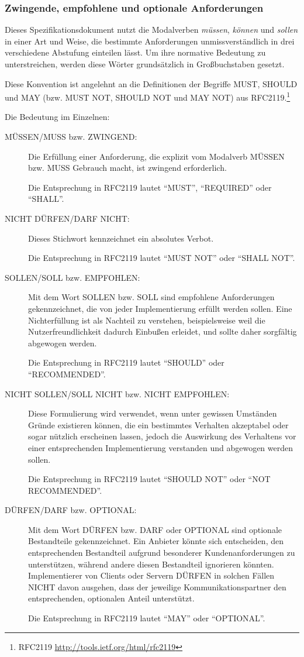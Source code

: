 \documentclass[,a4paper]{article}
\begin{document}
\subsubsection{Zwingende, empfohlene und optionale
Anforderungen}\label{mussux5fsollux5fdarf}

Dieses Spezifikationsdokument nutzt die Modalverben \emph{müssen},
\emph{können} und \emph{sollen} in einer Art und Weise, die bestimmte
Anforderungen unmissverständlich in drei verschiedene Abstufung
einteilen lässt. Um ihre normative Bedeutung zu unterstreichen, werden
diese Wörter grundsätzlich in Großbuchstaben gesetzt.

Diese Konvention ist angelehnt an die Definitionen der Begriffe MUST,
SHOULD und MAY (bzw. MUST NOT, SHOULD NOT und MAY NOT) aus
RFC2119.\footnote{RFC2119 \url{http://tools.ietf.org/html/rfc2119}}

Die Bedeutung im Einzelnen:

\begin{description}
\item[MÜSSEN/MUSS bzw. ZWINGEND:]
Die Erfüllung einer Anforderung, die explizit vom Modalverb MÜSSEN bzw.
MUSS Gebrauch macht, ist zwingend erforderlich.

Die Entsprechung in RFC2119 lautet ``MUST'', ``REQUIRED'' oder
``SHALL''.
\item[NICHT DÜRFEN/DARF NICHT:]
Dieses Stichwort kennzeichnet ein absolutes Verbot.

Die Entsprechung in RFC2119 lautet ``MUST NOT'' oder ``SHALL NOT''.
\item[SOLLEN/SOLL bzw. EMPFOHLEN:]
Mit dem Wort SOLLEN bzw. SOLL sind empfohlene Anforderungen
gekennzeichnet, die von jeder Implementierung erfüllt werden sollen.
Eine Nichterfüllung ist als Nachteil zu verstehen, beispielsweise weil
die Nutzerfreundlichkeit dadurch Einbußen erleidet, und sollte daher
sorgfältig abgewogen werden.

Die Entsprechung in RFC2119 lautet ``SHOULD'' oder ``RECOMMENDED''.
\item[NICHT SOLLEN/SOLL NICHT bzw. NICHT EMPFOHLEN:]
Diese Formulierung wird verwendet, wenn unter gewissen Umständen Gründe
existieren können, die ein bestimmtes Verhalten akzeptabel oder sogar
nützlich erscheinen lassen, jedoch die Auswirkung des Verhaltens vor
einer entsprechenden Implementierung verstanden und abgewogen werden
sollen.

Die Entsprechung in RFC2119 lautet ``SHOULD NOT'' oder ``NOT
RECOMMENDED''.
\item[DÜRFEN/DARF bzw. OPTIONAL:]
Mit dem Wort DÜRFEN bzw. DARF oder OPTIONAL sind optionale Bestandteile
gekennzeichnet. Ein Anbieter könnte sich entscheiden, den entsprechenden
Bestandteil aufgrund besonderer Kundenanforderungen zu unterstützen,
während andere diesen Bestandteil ignorieren könnten. Implementierer von
Clients oder Servern DÜRFEN in solchen Fällen NICHT davon ausgehen, dass
der jeweilige Kommunikationspartner den entsprechenden, optionalen
Anteil unterstützt.

Die Entsprechung in RFC2119 lautet ``MAY'' oder ``OPTIONAL''.
\end{description}
\end{document}
